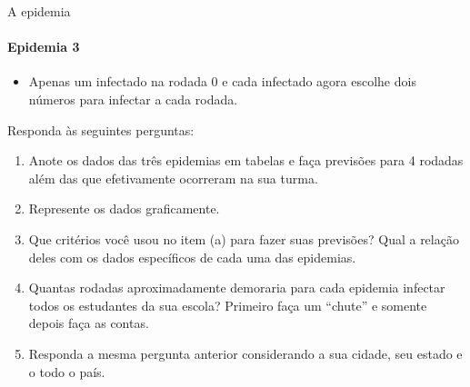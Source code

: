 \begin{task}{A epidemia}
\begin{itemize}
\end{itemize}

\paragraph{Epidemia 3}
\begin{itemize}

\item Apenas um infectado na rodada 0 e cada infectado agora escolhe dois números para infectar a cada rodada.

\end{itemize}

Responda às seguintes perguntas:

\begin{enumerate}
\item{} 
Anote os dados das três epidemias em tabelas e faça previsões para 4 rodadas além das que efetivamente ocorreram na sua turma.

\item{} 
Represente os dados graficamente.

\item{} 
Que critérios você usou no item (a) para fazer suas previsões? Qual a relação deles com os dados específicos de cada uma das epidemias.

\item{}
Quantas rodadas aproximadamente demoraria para cada epidemia infectar todos os estudantes da sua escola? Primeiro faça um “chute” e somente depois faça as contas.

\item{}
Responda a mesma pergunta anterior considerando a sua cidade, seu estado e o todo o país.

\end{enumerate}
\end{task}

